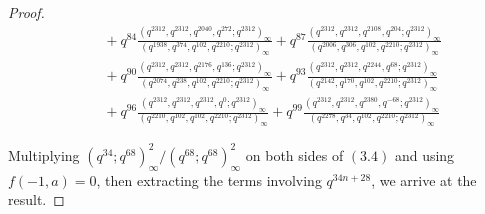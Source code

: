 \documentclass[11pt,a4paper]{article}
\numberwithin{equation}{section}
\theoremstyle{plain}
\begin{document}
\begin{proof}
\[\begin{aligned}
			&\quad + q^{84}\frac{(q^{2312}, q^{2312}, q^{2040}, q^{272}; q^{2312})_{\infty}}
			{(q^{1938}, q^{374}, q^{102}, q^{2210}; q^{2312})_{\infty}}
			+ q^{87}\frac{(q^{2312}, q^{2312}, q^{2108}, q^{204}; q^{2312})_{\infty}}
			{(q^{2006}, q^{306}, q^{102}, q^{2210}; q^{2312})_{\infty}} \\
			&\quad + q^{90}\frac{(q^{2312}, q^{2312}, q^{2176}, q^{136}; q^{2312})_{\infty}}
			{(q^{2074}, q^{238}, q^{102}, q^{2210}; q^{2312})_{\infty}}
			+ q^{93}\frac{(q^{2312}, q^{2312}, q^{2244}, q^{68}; q^{2312})_{\infty}}
			{(q^{2142}, q^{170}, q^{102}, q^{2210}; q^{2312})_{\infty}} \\
			&\quad +  q^{96}\frac{(q^{2312}, q^{2312}, q^{2312}, q^{0}; q^{2312})_{\infty}}
			{(q^{2210}, q^{102}, q^{102}, q^{2210}; q^{2312})_{\infty}}
			+ q^{99}\frac{(q^{2312}, q^{2312}, q^{2380}, q^{-68}; q^{2312})_{\infty}}
			{(q^{2278}, q^{34}, q^{102}, q^{2210}; q^{2312})_{\infty}} 
		\end{aligned}
		\tag{3.4}
		\]
		
		Multiplying ${(q^{34}; q^{68})_{\infty}^{2}}/{(q^{68}; q^{68})_{\infty}^{2}}$ on both sides of $(3.4)$ and using $f(-1, a)=0$, then extracting the terms involving $q^{34n+28}$, we arrive at the result.
	\end{proof}
	
\end{document}
